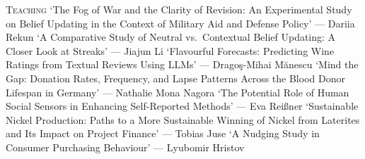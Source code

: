 \begin{rubric}{\textsc{Teaching}}
\entry*[2025] `The Fog of War and the Clarity of Revision: An Experimental Study on Belief Updating in the Context of Military Aid and Defense Policy' --- Dariia Rekun
\entry*[2025] `A Comparative Study of Neutral vs.\ Contextual Belief Updating: A Closer Look at Streaks' --- Jiajun Li
\entry*[2025] `Flavourful Forecasts: Predicting Wine Ratings from Textual Reviews Using LLMs' --- Drago\c{s}-Mihai M\u{a}nescu
\entry*[2024] `Mind the Gap: Donation Rates, Frequency, and Lapse Patterns Across the Blood Donor Lifespan in Germany' --- Nathalie Mona Nagora
\entry*[2023] `The Potential Role of Human Social Sensors in Enhancing Self-Reported Methods' --- Eva Rei\ss{}ner
\entry*[2022] `Sustainable Nickel Production: Paths to a More Sustainable Winning of Nickel from Laterites and Its Impact on Project Finance' --- Tobias Juse
\entry*[2021] `A Nudging Study in Consumer Purchasing Behaviour' --- Lyubomir Hristov



\end{rubric}
